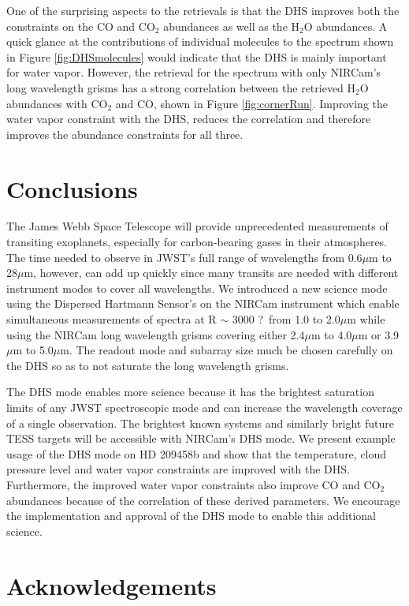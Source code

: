 \documentclass{emulateapj}
\newcommand{\DHSres}{3000 ?}
\begin{document}
One of the surprising aspects to the retrievals is that the DHS improves both the constraints on the CO and CO$_2$ abundances as well as the H$_2$O abundances. A quick glance at the contributions of individual molecules to the spectrum shown in Figure \ref{fig:DHSmolecules} would indicate that the DHS is mainly important for water vapor. However, the retrieval for the spectrum with only NIRCam's long wavelength grisms has a strong correlation between the retrieved H$_2$O abundances with CO$_2$ and CO, shown in Figure \ref{fig:cornerRun}. Improving the water vapor constraint with the DHS, reduces the correlation and therefore improves the abundance constraints for all three.

\section{Conclusions}

The James Webb Space Telescope will provide unprecedented measurements of transiting exoplanets, especially for carbon-bearing gases in their atmospheres. The time needed to observe in JWST's full range of wavelengths from 0.6$\mu$m to 28$\mu$m, however, can add up quickly since many transits are needed with different instrument modes to cover all wavelengths. We introduced a new science mode using the Dispersed Hartmann Sensor's on the NIRCam instrument which enable simultaneous measurements of spectra at R $\sim$ \DHSres\ from 1.0 to 2.0$\mu$m while using the NIRCam long wavelength grisms covering either 2.4$\mu$m to 4.0$\mu$m or 3.9$\mu$m to 5.0$\mu$m. The readout mode and subarray size much be chosen carefully on the DHS so as to not saturate the long wavelength grisms.

The DHS mode enables more science because it has the brightest saturation limits of any JWST spectroscopic mode and can increase the wavelength coverage of a single observation. The brightest known systems and similarly bright future TESS targets will be accessible with NIRCam's DHS mode. We present example usage of the DHS mode on HD 209458b and show that the temperature, cloud pressure level and water vapor constraints are improved with the DHS. Furthermore, the improved water vapor constraints also improve CO and CO$_2$ abundances because of the correlation of these derived parameters. We encourage the implementation and approval of the DHS mode to enable this additional science.

\section{Acknowledgements}
\end{document}
